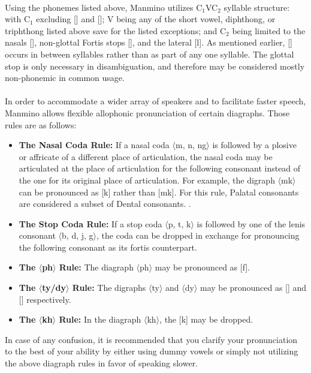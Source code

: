 \documentclass{book}
\begin{document}
    \paragraph{}
    Using the phonemes listed above, Manmino utilizes C$_1$VC$_2$ syllable structure: with C$_1$ excluding [] and []; V being any of the short vowel, diphthong, or triphthong listed above save for the listed exceptions; and C$_2$ being limited to the nasals [], non-glottal Fortis stops [], and the lateral [l]. As mentioned earlier, [] occurs in between syllables rather than as part of any one syllable. The glottal stop is only necessary in disambiguation, and therefore may be considered mostly non-phonemic in common usage. 
    \paragraph{}
    In order to accommodate a wider array of speakers and to facilitate faster speech, Manmino allows flexible allophonic pronunciation of certain diagraphs. Those rules are as follows:
        \begin{itemize}
            \item \textbf{The Nasal Coda Rule:} If a nasal coda $\langle{}$m, n, ng$\rangle{}$ is followed by a plosive or affricate of a different place of articulation, the nasal coda may be articulated at the place of articulation for the following consonant instead of the one for its original place of articulation. For example, the digraph $\langle{}$mk$\rangle{}$ can be pronounced as [k] rather than [mk]. For this rule, Palatal consonants are considered a subset of Dental consonants. .
            \item \textbf{The Stop Coda Rule:} If a stop coda $\langle{}$p, t, k$\rangle{}$ is followed by one of the lenis consonant $\langle{}$b, d, j, g$\rangle{}$, the coda can be dropped in exchange for pronouncing the following consonant as its fortis counterpart. 
            \item \textbf{The $\langle{}$ph$\rangle{}$ Rule:} The diagraph $\langle{}$ph$\rangle{}$ may be pronounced as [f].
            \item \textbf{The $\langle{}$ty/dy$\rangle{}$ Rule: }The digraphs $\langle{}$ty$\rangle{}$ and $\langle{}$dy$\rangle{}$ may be pronounced as [\texttctclig{}] and [\textdctzlig{}] respectively.
            \item \textbf{The $\langle{}$kh$\rangle{}$ Rule: }In the diagraph $\langle{}$kh$\rangle{}$, the [k] may be dropped.
        \end{itemize}
    In case of any confusion, it is recommended that you clarify your pronunciation to the best of your ability by either using dummy vowels or simply not utilizing the above diagraph rules in favor of speaking slower.
    \vfill \newpage 
\end{document}
